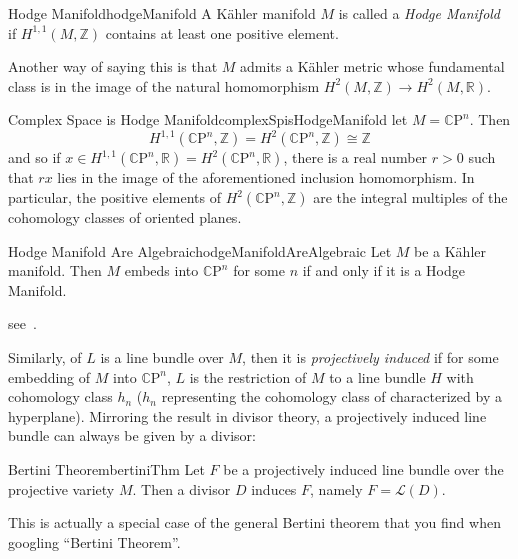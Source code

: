 \documentclass{book}
\newenvironment{Proof}[1][]
  {\begin{ProofTcb}[#1]}
  {\end{ProofTcb}}
\newcommand{\R}{{\mathbb{R}}}
\newcommand{\Z}{{\mathbb{Z}}}
\newcommand{\CL}{{\mathcal{L}}}
\newcommand{\CP}{{\mathbb{C}\mathrm{P}}}
\begin{document}
\begin{defn}{Hodge Manifold}{hodgeManifold}
  A K\"ahler manifold $M$ is called a \emph{Hodge Manifold} if $H^{1,1}(M, \Z)$ contains at least one positive
  element.
\end{defn}

Another way of saying this is that $M$ admits a K\"ahler metric whose fundamental class is in the image of the
natural homomorphism $H^2(M, \Z) \to H^2(M, \R)$.

\begin{example}{Complex Space is Hodge Manifold}{complexSpisHodgeManifold}
  let $M = \CP^n$. Then
  \[
    H^{1,1}(\CP^n, \Z) = H^2(\CP^n, \Z) \cong \Z
  \]
  and so if $x \in H^{1,1}(\CP^n, \R) = H^2(\CP^n, \R)$, there is a real number $r > 0$ such that $rx$ lies in
  the image of the aforementioned inclusion homomorphism. In particular, the positive elements of $H^2(\CP^n,
  \Z)$ are the integral multiples of the cohomology classes of oriented planes.
\end{example}

\begin{thm}{Hodge Manifold Are Algebraic}{hodgeManifoldAreAlgebraic}
  Let $M$ be a K\"ahler manifold. Then $M$ embeds into $\CP^n$ for some $n$ if and only if it is a Hodge
  Manifold.
\end{thm}

\begin{Proof}
  see~\cite{voisinHodgeTheoryComplex2002}.
\end{Proof}

Similarly, of $L$ is a line bundle over $M$, then it is \emph{projectively induced} if for some embedding of
$M$ into $\CP^n$, $L$ is the restriction of $M$ to a line bundle $H$ with cohomology class $h_n$ ($h_n$
representing the cohomology class of characterized by a hyperplane). Mirroring the result in divisor theory,
a projectively induced line bundle can always be given by a divisor:


\begin{thm}{Bertini Theorem}{bertiniThm}
  Let $F$ be a projectively induced line bundle over the projective variety $M$. Then a divisor
  $D$ induces $F$, namely $F = \CL(D)$.
\end{thm}

This is actually a special case of the general Bertini theorem that you find when googling ``Bertini
Theorem''.

\begin{Proof}
  \cite{voisinHodgeTheoryComplex2002}
\end{Proof}
\end{document}
